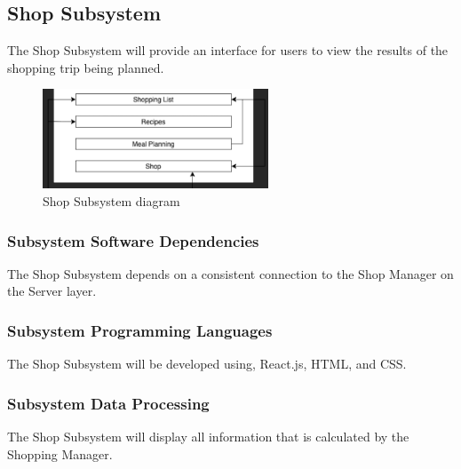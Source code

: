 \subsection{Shop Subsystem}
The Shop Subsystem will provide an interface for users to view the results of the shopping trip being planned.

\begin{figure}[h!]
	\centering
 	\includegraphics[width=0.60\textwidth]{images/shoppingList}
 \caption{Shop Subsystem diagram}
\end{figure}

\subsubsection{Subsystem Software Dependencies}
The Shop Subsystem depends on a consistent connection to the Shop Manager on the Server layer.

\subsubsection{Subsystem Programming Languages}
The Shop Subsystem will be developed using, React.js, HTML, and CSS.

\subsubsection{Subsystem Data Processing}
The Shop Subsystem will display all information that is calculated by the Shopping Manager.


